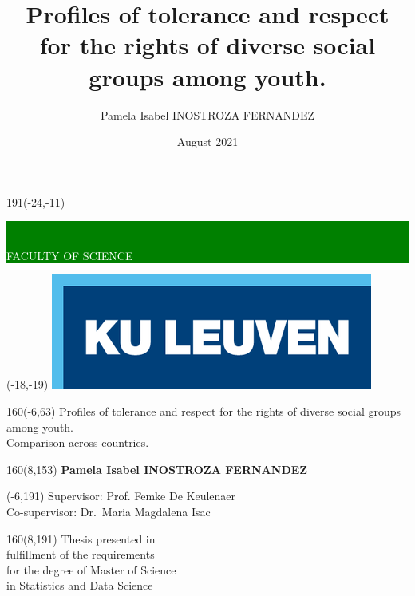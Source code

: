 \documentclass[12pt,a4paper,oneside]{reedthesis}
\title{Profiles of tolerance and respect for the rights of diverse social groups among youth.}
\author{Pamela Isabel INOSTROZA FERNANDEZ}
\date{August 2021}
\institute{Leuven Statistics Research Centre}
\begin{document}
\thispagestyle{empty}
\newcommand{\form}[1]{\scalebox{1.087}{\boldmath{#1}}}
\sffamily
%
\begin{textblock}{191}(-24,-11)
\colorbox{green}{\hspace{139mm}\ \parbox[c][18truemm]{52mm}{\textcolor{white}{FACULTY OF SCIENCE}}}
\end{textblock}
%
\begin{textblock}{70}(-18,-19)
\textblockcolour{}
\includegraphics*[height=19.8truemm]{LogoKULeuven}
\end{textblock}
%
\begin{textblock}{160}(-6,63)
\textblockcolour{}
\vspace{-\parskip}
\flushleft
\fontsize{40}{42}\selectfont \textcolor{bluetitle}{Profiles of tolerance and respect for the rights of diverse social groups among youth.}\\[1.5mm]
\fontsize{20}{22}\selectfont Comparison across countries.
\end{textblock}
%
\begin{textblock}{160}(8,153)
\textblockcolour{}
\vspace{-\parskip}
\flushright
\fontsize{14}{16}\selectfont \textbf{Pamela Isabel INOSTROZA FERNANDEZ}
\end{textblock}
%
\begin{textblock}{70}(-6,191)
\textblockcolour{}
\vspace{-\parskip}
\flushleft
Supervisor: Prof. Femke De Keulenaer\\[-2pt]
Co-supervisor: Dr.~Maria Magdalena Isac\\[-2pt]
\end{textblock}
%
\begin{textblock}{160}(8,191)
\textblockcolour{}
\vspace{-\parskip}
\flushright
Thesis presented in\\[4.5pt]
fulfillment of the requirements\\[4.5pt]
for the degree of Master of Science\\[4.5pt]
in Statistics and Data Science\\
\end{textblock}
\end{document}
